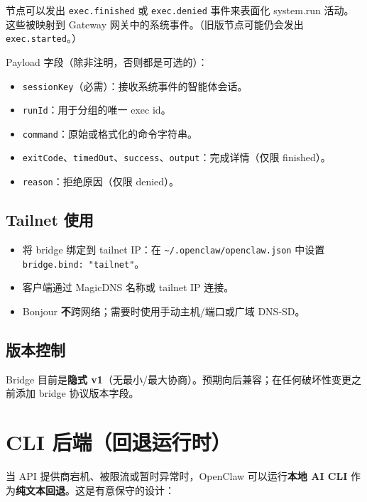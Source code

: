 节点可以发出 \texttt{exec.finished} 或 \texttt{exec.denied} 事件来表面化 system.run 活动。
这些被映射到 Gateway 网关中的系统事件。（旧版节点可能仍会发出 \texttt{exec.started}。）

Payload 字段（除非注明，否则都是可选的）：

\begin{itemize}
  \item \texttt{sessionKey}（必需）：接收系统事件的智能体会话。
  \item \texttt{runId}：用于分组的唯一 exec id。
  \item \texttt{command}：原始或格式化的命令字符串。
  \item \texttt{exitCode}、\texttt{timedOut}、\texttt{success}、\texttt{output}：完成详情（仅限 finished）。
  \item \texttt{reason}：拒绝原因（仅限 denied）。
\end{itemize}


\subsection{Tailnet 使用}


\begin{itemize}
  \item 将 bridge 绑定到 tailnet IP：在 \texttt{\textasciitilde{}/.openclaw/openclaw.json} 中设置 \texttt{bridge.bind: "tailnet"}。
  \item 客户端通过 MagicDNS 名称或 tailnet IP 连接。
  \item Bonjour \textbf{不}跨网络；需要时使用手动主机/端口或广域 DNS‑SD。
\end{itemize}


\subsection{版本控制}


Bridge 目前是\textbf{隐式 v1}（无最小/最大协商）。预期向后兼容；在任何破坏性变更之前添加 bridge 协议版本字段。


\clearpage

\section{CLI 后端（回退运行时）}


当 API 提供商宕机、被限流或暂时异常时，OpenClaw 可以运行\textbf{本地 AI CLI} 作为\textbf{纯文本回退}。这是有意保守的设计：

